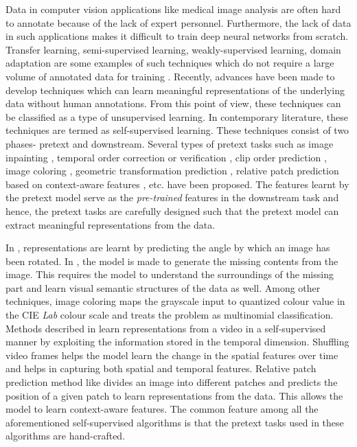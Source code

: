 \documentclass[journal]{IEEEtai}
\begin{document}
 Data in computer vision applications like medical image analysis are often hard to annotate because of the lack of expert personnel. Furthermore, the lack of data in such applications makes it difficult to train deep neural networks from scratch. Transfer learning, semi-supervised learning, weakly-supervised learning, domain adaptation are some examples of such techniques which do not require a large volume of annotated data for training \cite{surveytransl, surveysemisup, surveysemisup2, surveyweaksup}. Recently, advances have been made to develop techniques \cite{shuffleandlearn, temporder, oddoneout, cliporder, sssptemporder, imgcolor, rotnet, videorotnet, contextpred} which can learn meaningful representations of the underlying data without human annotations. From this point of view, these techniques can be classified as a type of unsupervised learning. In contemporary literature, these techniques are termed as self-supervised learning. These techniques consist of two phases- pretext and downstream. Several types of pretext tasks such as image inpainting \cite{contextenc},
temporal order correction or verification \cite{shuffleandlearn, temporder, oddoneout, sssptemporder},
clip order prediction \cite{cliporder},
image coloring \cite{imgcolor},
geometric transformation prediction \cite{rotnet, videorotnet},
relative patch prediction based on context-aware features \cite{contextpred},
etc. have been proposed. The features learnt by the pretext model serve as the \textit{pre-trained} features in the downstream task and hence, the pretext tasks are carefully designed such that the pretext model can extract meaningful representations from the data.

\indent In \cite{rotnet}, representations are learnt by predicting the angle by which an image has been rotated. In \cite{contextenc}, the model is made to generate the missing contents from the image. This requires the model to understand the surroundings of the missing part and learn visual semantic structures of the data as well. Among other techniques, image coloring \cite{imgcolor} maps the grayscale input to quantized colour value in the CIE \textit{Lab} colour scale and treats the problem as multinomial classification. Methods described in \cite{shuffleandlearn, temporder, oddoneout, cliporder, sssptemporder} learn representations from a video in a self-supervised manner by exploiting the information stored in the temporal dimension. Shuffling video frames helps the model learn the change in the spatial features over time and helps in capturing both spatial and temporal features. Relative patch prediction method like \cite{contextpred} divides an image into different patches and predicts the position of a given patch to learn representations from the data. This allows the model to learn context-aware features. The common feature among all the aforementioned self-supervised algorithms is that the pretext tasks used in these algorithms are hand-crafted. 
\end{document}
